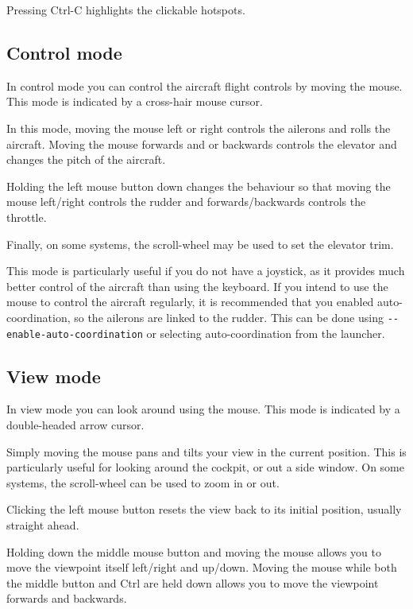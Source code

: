 Pressing Ctrl-C highlights the clickable hotspots.

\subsection{Control mode}

In control mode you can control the aircraft flight controls by moving the mouse.
This mode is indicated by a cross-hair mouse cursor.

In this mode, moving the mouse left or right controls the ailerons and rolls the aircraft.
Moving the mouse forwards and or backwards controls the elevator and changes the pitch
of the aircraft.

Holding the left mouse button down changes the behaviour so that moving the mouse left/right
controls the rudder  and forwards/backwards controls the throttle.

Finally, on some systems, the scroll-wheel may be used to set the elevator trim.

This mode is particularly useful if you do not have a joystick, as it provides much better
control of the aircraft than using the keyboard. If you intend to use the mouse to control
the aircraft regularly, it is recommended that you enabled auto-coordination, so the
ailerons are linked to the rudder. This can be done using \texttt{-$ $-enable-auto-coordination}
or selecting auto-coordination from the launcher.

\subsection{View mode}

In view mode you can look around using the mouse. This mode is indicated by a double-headed
arrow cursor.

Simply moving the mouse pans and tilts your view in the current position. This is particularly
useful for looking around the cockpit, or out a side window. On some systems, the scroll-wheel
can be used to zoom in or out.

Clicking the left mouse button resets the view back to its initial position, usually straight
ahead.

Holding down the middle mouse button and moving the mouse allows you to move the viewpoint
itself left/right and up/down. Moving the mouse while both the middle button and Ctrl are
held down allows you to move the viewpoint forwards and backwards.

